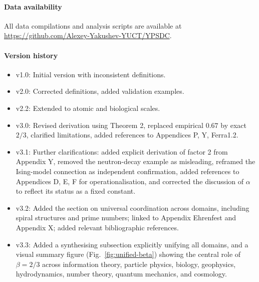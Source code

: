 \documentclass[12pt]{article}
\begin{document}
	\paragraph*{Data availability}
	All data compilations and analysis scripts are available at \url{https://github.com/Alexey-Yakushev-YUCT/YPSDC}.
	
	\paragraph*{Version history}
	\begin{itemize}
		\item v1.0: Initial version with inconsistent definitions.
		\item v2.0: Corrected definitions, added validation examples.
		\item v2.2: Extended to atomic and biological scales.
		\item v3.0: Revised derivation using Theorem 2, replaced empirical \(0.67\) by exact \(2/3\), clarified limitations, added references to Appendices P, Y, Ferra1.2.
		\item v3.1: Further clarifications: added explicit derivation of factor 2 from Appendix Y, removed the neutron-decay example as misleading, reframed the Ising-model connection as independent confirmation, added references to Appendices D, E, F for operationalisation, and corrected the discussion of \(\alpha\) to reflect its status as a fixed constant.
		\item v3.2: Added the section on universal coordination across domains, including spiral structures and prime numbers; linked to Appendix Ehrenfest and Appendix X; added relevant bibliographic references.
		\item v3.3: Added a synthesising subsection explicitly unifying all domains, and a visual summary figure (Fig.~\ref{fig:unified-beta}) showing the central role of \(\beta = 2/3\) across information theory, particle physics, biology, geophysics, hydrodynamics, number theory, quantum mechanics, and cosmology.
	\end{itemize}
	
\end{document}
